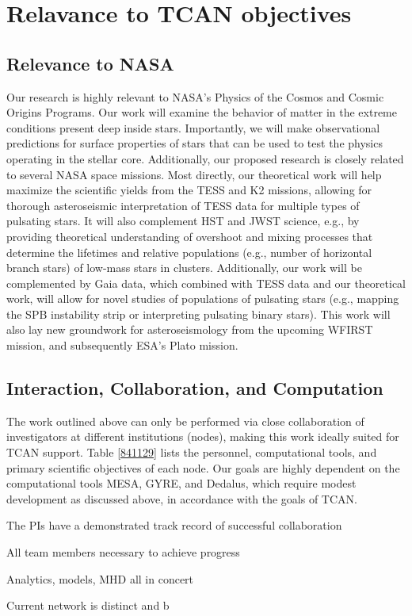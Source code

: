 
\section{Relavance to TCAN objectives}

\subsection{Relevance to NASA}


Our research is highly relevant to NASA's Physics of the Cosmos and Cosmic Origins Programs. Our work will examine the behavior of matter in the extreme conditions present deep inside stars. Importantly, we will make observational predictions for surface properties of stars that can be used to test the physics operating in the stellar core. Additionally, our proposed research is closely related to several NASA space missions. Most directly, our theoretical work will help maximize the scientific yields from the TESS and K2 missions, allowing for thorough asteroseismic interpretation of TESS data for multiple types of pulsating stars. It will also complement HST and JWST science, e.g., by providing theoretical understanding of overshoot and mixing processes that determine the lifetimes and relative populations (e.g., number of horizontal branch stars) of low-mass stars in clusters. Additionally, our work will be complemented by Gaia data, which combined with TESS data and our theoretical work, will allow for novel studies of populations of pulsating stars (e.g., mapping the SPB instability strip or interpreting pulsating binary stars). This work will also lay new groundwork for asteroseismology from the upcoming WFIRST mission, and subsequently ESA's Plato mission. 


\subsection{Interaction, Collaboration, and Computation}

The work outlined above can only be performed via close collaboration of investigators at different institutions (nodes), making this work ideally suited for TCAN support. Table \ref{841129} lists the personnel, computational tools, and primary scientific objectives of each node. Our goals are highly dependent on the computational tools MESA, GYRE, and Dedalus, which require modest development as discussed above, in accordance with the goals of TCAN.

The PIs have a demonstrated track record of successful collaboration

All team members necessary to achieve progress

Analytics, models, MHD all in concert

Current network is distinct and b

